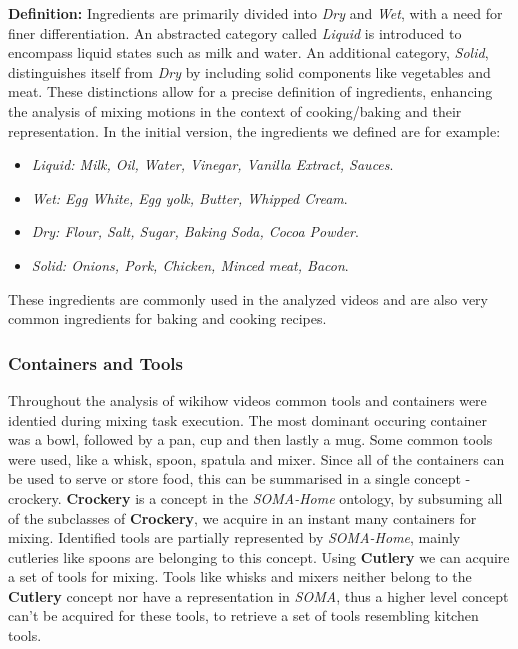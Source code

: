 \textbf{Definition:}
Ingredients are primarily divided into \textit{Dry} and \textit{Wet}, with a need for finer differentiation. An abstracted category called \textit{Liquid} is introduced to encompass liquid states such as milk and water. An additional category, \textit{Solid}, distinguishes itself from \textit{Dry} by including solid components like vegetables and meat. These distinctions allow for a precise definition of ingredients, enhancing the analysis of mixing motions in the context of cooking/baking and their representation.
In the initial version, the ingredients we defined are for example:
\begin{itemize}
  \item \textit{Liquid: Milk, Oil, Water, Vinegar, Vanilla Extract, Sauces}.
  \item \textit{Wet: Egg White, Egg yolk, Butter, Whipped Cream}.
  \item \textit{Dry: Flour, Salt, Sugar, Baking Soda, Cocoa Powder}.
  \item \textit{Solid: Onions, Pork, Chicken, Minced meat, Bacon}.
\end{itemize}
These ingredients are commonly used in the analyzed videos and are also very common ingredients for baking and cooking recipes.


\subsubsection*{Containers and Tools}
\label{sec:ContainersAndToolsAcquisition}
Throughout the analysis of wikihow videos common tools and containers were identied during mixing task execution.
The most dominant occuring container was a bowl, followed by a pan, cup and then lastly a mug. Some common tools were used, like a whisk, spoon, spatula and mixer.
Since all of the containers can be used to serve or store food, this can be summarised in a single concept - crockery. \textbf{Crockery} is a concept in the \textit{SOMA-Home}
ontology, by subsuming all of the subclasses of \textbf{Crockery}, we acquire in an instant many containers for mixing. Identified tools are partially represented by \textit{SOMA-Home},
mainly cutleries like spoons are belonging to this concept. Using \textbf{Cutlery} we can acquire a set of tools for mixing. Tools like whisks and mixers neither belong 
to the \textbf{Cutlery} concept nor have a representation in \textit{SOMA}, thus a higher level concept can't be acquired for these tools, to retrieve a set of tools resembling
kitchen tools. 

